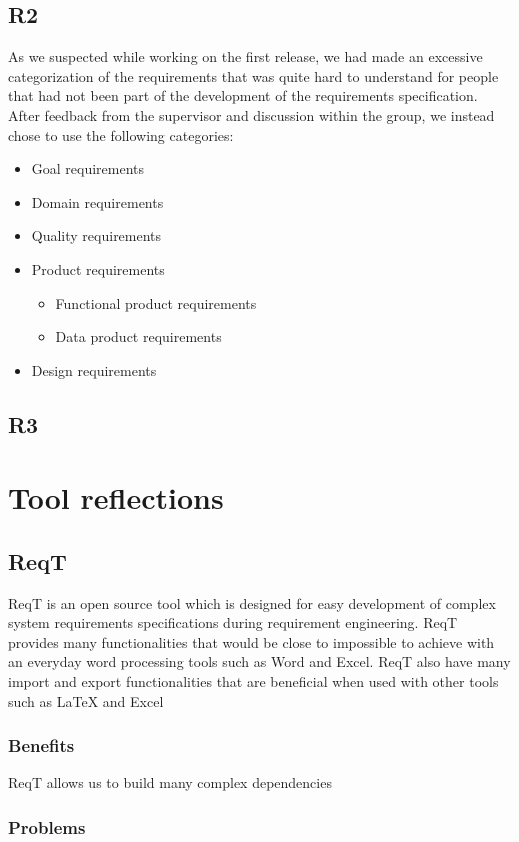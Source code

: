 \documentclass[10pt]{article}
\begin{document}
\subsection{R2}
As we suspected while working on the first release, we had made an excessive categorization of the requirements that was quite hard to understand for people that had not been part of the development of the requirements specification. After feedback from the supervisor and discussion within the group, we instead chose to use the following categories: 
\begin{itemize}
\item Goal requirements
\item Domain requirements
\item Quality requirements
\item Product requirements
\begin{itemize}
\item Functional product requirements
\item Data product requirements
\end{itemize} 
\item Design requirements
\end{itemize}

\subsection{R3}


\section{Tool reflections}
\noindent
\subsection{ReqT}
ReqT is an open source tool which is designed for easy development of complex system requirements specifications during requirement engineering. ReqT provides many functionalities that would be close to impossible to achieve with an everyday word processing tools such as Word and Excel. ReqT also have many import and export functionalities that are beneficial when used with other tools such as LaTeX and Excel
\subsubsection{Benefits}
ReqT allows us to build many complex dependencies
\subsubsection{Problems}
\end{document}
